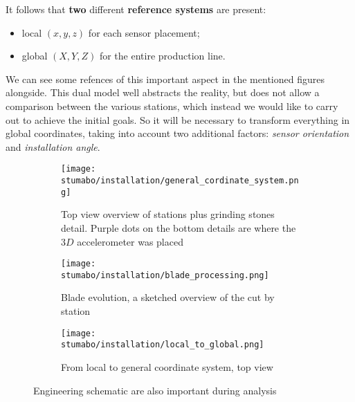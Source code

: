 It follows that \textbf{two} different \textbf{reference systems} are present:
\begin{itemize}\label{item:double_system}
    \item local $(x,y,z)$ for each sensor placement;
    \item global $(X,Y,Z)$ for the entire production line.
\end{itemize}
We can see some refences of this important aspect in the mentioned figures alongside. %
This dual model well abstracts the reality, but does not allow a comparison between the various stations, which instead we would like to carry out to achieve the initial goals.
So it will be necessary to transform everything in global coordinates, taking into account two additional factors:
 \textit{sensor orientation} and 
 \textit{installation angle}. 
\begin{figure}[!htp]
    \begin{subfigure}{\textwidth}
        \texttt{[image: stumabo/installation/general\_cordinate\_system.png]}
        \caption{Top view overview of stations plus grinding stones detail.
            Purple dots on the bottom details are where the $3D$ accelerometer was placed}
        \label{fig:top_view_line}
    \end{subfigure}
    \begin{subfigure}{\textwidth}
        \texttt{[image: stumabo/installation/blade\_processing.png]}
        \caption{Blade evolution, a sketched overview of the cut by station}
        \label{fig:blade_evolution}
    \end{subfigure}
    \begin{subfigure}{\textwidth}
        \texttt{[image: stumabo/installation/local\_to\_global.png]}
        \caption{From local to general coordinate system, top view}
        \label{fig:local_to_global}
    \end{subfigure}
    \caption{Engineering schematic are also important during analysis}
    \label{fig:engineering_files}
\end{figure}

